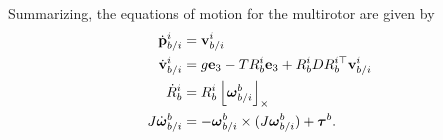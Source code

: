 Summarizing, the equations of motion for the multirotor are given by
\begin{align}
	\dot{\pbf}_{b/i}^i &= \vbf_{b/i}^i \label{eq:eom_p} \\
	\dot{\vbf}_{b/i}^i &= g \ebf_3 - TR_b^i \ebf_3 + R_b^i D R_b^{i\top} \vbf_{b/i}^i  \label{eq:eom_v} \\
	\dot{R}_b^i &= R_b^i \ss{\omegabf_{b/i}^b} \label{eq:eom_R} \\
	J\dot{\omegabf}_{b/i}^b &= -\omegabf_{b/i}^b \times (J\omegabf_{b/i}^b) + \taubf^b. \label{eq:eom_omega}
\end{align}



